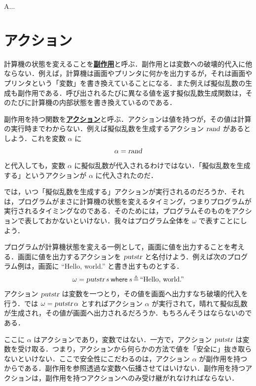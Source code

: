 \documentclass[a4paper,twocolumn]{jsbook}
\newcommand{\keyword}[1]{{\underline{\textbf{#1}}}}
\newcommand{\mKeyword}[1]{\mathsf{#1}} %
\newcommand{\mWhereKeyword}{\mKeyword{where}}
\newcommand{\mString}[1]{\text{#1}}
\newcommand{\mAction}[1]{\textsl{#1}}
\DeclareMathOperator{\mPutStr}{\mAction{putstr}}
\DeclareMathOperator{\mRand}{\mAction{rand}}
\DeclareMathOperator{\mLetEq}{\triangleq}
\newcommand{\mWhere}[2]{\mathbin{\mWhereKeyword}#1\mLetEq#2}
\begin{document}
A...

\section{アクション}

計算機の状態を変えることを\keyword{副作用}と呼ぶ．副作用とは変数への破壊的代入に他ならない．例えば，計算機は画面やプリンタに何かを出力するが，それは画面やプリンタという「変数」を書き換えていることになる．また例えば擬似乱数の生成も副作用である．呼び出されるたびに異なる値を返す擬似乱数生成関数は，そのたびに計算機の内部状態を書き換えているのである．

副作用を持つ関数を\keyword{アクション}と呼ぶ．アクションは値を持つが，その値は計算の実行時までわからない．例えば擬似乱数を生成するアクション $\mRand$ があるとしよう．これを変数 $\alpha$ に
\begin{equation}
\alpha=\mRand
\end{equation}
と代入しても，変数 $\alpha$ に擬似乱数が代入されるわけではない．「擬似乱数を生成する」というアクションが $\alpha$ に代入されたのだ．

では，いつ「擬似乱数を生成する」アクションが実行されるのだろうか．それは，プログラムがまさに計算機の状態を変えるタイミング，つまりプログラムが実行されるタイミングなのである．そのためには，プログラムそのものをアクションで表しておかないといけない．我々はプログラム全体を $\omega$ で表すことにしよう．

プログラムが計算機状態を変える一例として，画面に値を出力することを考える．画面に値を出力するアクションを $\mPutStr$ と名付けよう．例えば次のプログラム例は，画面に ``Hello, world.'' と書き出すものとする．
\begin{equation}
\omega=\mPutStr s\mWhere{s}{\mString{``Hello, world.''}}
\end{equation}
アクション $\mPutStr$ は変数を一つとり，その値を画面へ出力すなち破壊的代入を行う．では $\omega=\mPutStr\alpha$ とすればアクション $\alpha$ が実行されて，晴れて擬似乱数が生成され，その値が画面へ出力されるだろうか．もちろんそうはならないのである．

ここに $\alpha$ はアクションであり，変数ではない．一方で，アクション $\mPutStr$ は変数を受け取る．つまり，アクションから何らかの方法で値を「安全に」抜き取らないといけない．ここで安全性にこだわるのは，アクション $\alpha$ が副作用を持つからである．副作用を参照透過な変数へ伝播させてはいけない．副作用を持つアクションは，副作用を持つアクションへのみ受け継がれなければならない．
\end{document}
